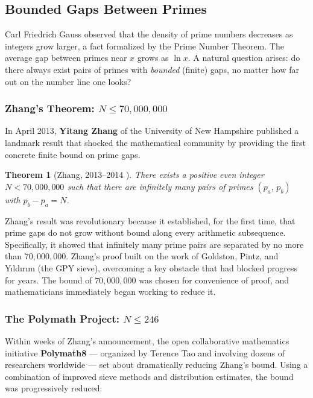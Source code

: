 \documentclass[11pt]{article}
\theoremstyle{plain}
\newtheorem{theorem}{Theorem}
\theoremstyle{definition}
\theoremstyle{remark}
\begin{document}
\subsection{Bounded Gaps Between Primes}

\par Carl Friedrich Gauss observed that the density of prime numbers decreases as integers grow larger, a fact formalized by the Prime Number Theorem. The average gap between primes near $x$ grows as $\ln x$. A natural question arises: do there always exist pairs of primes with \textit{bounded} (finite) gaps, no matter how far out on the number line one looks?

\subsubsection{Zhang's Theorem: $N \leq 70{,}000{,}000$}

\par In April 2013, \textbf{Yitang Zhang} of the University of New Hampshire published a landmark result that shocked the mathematical community by providing the first concrete finite bound on prime gaps.

\begin{theorem}[Zhang, 2013--2014 \cite{zhang_primes_2014,aimath_zhang}]
	\label{thm:zhngthm}
	There exists a positive even integer $N < 70{,}000{,}000$ such that there are infinitely many pairs of primes $(p_a,\, p_b)$ with $p_b - p_a = N$.
\end{theorem}

\par Zhang's result was revolutionary because it established, for the first time, that prime gaps do not grow without bound along every arithmetic subsequence. Specifically, it showed that infinitely many prime pairs are separated by no more than $70{,}000{,}000$. Zhang's proof built on the work of Goldston, Pintz, and Y{\i}ld{\i}r{\i}m \cite{goldston_gpy_2009} (the GPY sieve), overcoming a key obstacle that had blocked progress for years. The bound of $70{,}000{,}000$ was chosen for convenience of proof, and mathematicians immediately began working to reduce it.

\subsubsection{The Polymath Project: $N \leq 246$}

\par Within weeks of Zhang's announcement, the open collaborative mathematics initiative \textbf{Polymath8} --- organized by Terence Tao and involving dozens of researchers worldwide \cite{wiki_polymath} --- set about dramatically reducing Zhang's bound. Using a combination of improved sieve methods and distribution estimates, the bound was progressively reduced:
\end{document}
